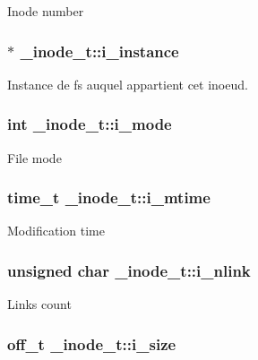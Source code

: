 \-Inode number \hypertarget{struct__inode__t_affefc88b22f45e2ec8340d582486d0f2}{
\subsubsection[{i\-\_\-instance}]{$\ast$ {\bf \-\_\-inode\-\_\-t\-::i\-\_\-instance}}}\label{struct__inode__t_affefc88b22f45e2ec8340d582486d0f2}
\-Instance de fs auquel appartient cet inoeud. \hypertarget{struct__inode__t_acead4732b6c22ef17ada59203509e728}{
\subsubsection[{i\-\_\-mode}]{\setlength{\rightskip}{0pt plus 5cm}int {\bf \-\_\-inode\-\_\-t\-::i\-\_\-mode}}}\label{struct__inode__t_acead4732b6c22ef17ada59203509e728}
\-File mode \hypertarget{struct__inode__t_a331d724391efce2f89aeb1a503ae5c43}{
\subsubsection[{i\-\_\-mtime}]{\setlength{\rightskip}{0pt plus 5cm}time\-\_\-t {\bf \-\_\-inode\-\_\-t\-::i\-\_\-mtime}}}\label{struct__inode__t_a331d724391efce2f89aeb1a503ae5c43}
\-Modification time \hypertarget{struct__inode__t_a929fc1e6837d02a2525027a121b4e67e}{
\subsubsection[{i\-\_\-nlink}]{\setlength{\rightskip}{0pt plus 5cm}unsigned char {\bf \-\_\-inode\-\_\-t\-::i\-\_\-nlink}}}\label{struct__inode__t_a929fc1e6837d02a2525027a121b4e67e}
\-Links count \hypertarget{struct__inode__t_aed37b31c96c90873201abfc8b4b3e463}{
\subsubsection[{i\-\_\-size}]{\setlength{\rightskip}{0pt plus 5cm}off\-\_\-t {\bf \-\_\-inode\-\_\-t\-::i\-\_\-size}}}\label{struct__inode__t_aed37b31c96c90873201abfc8b4b3e463}
